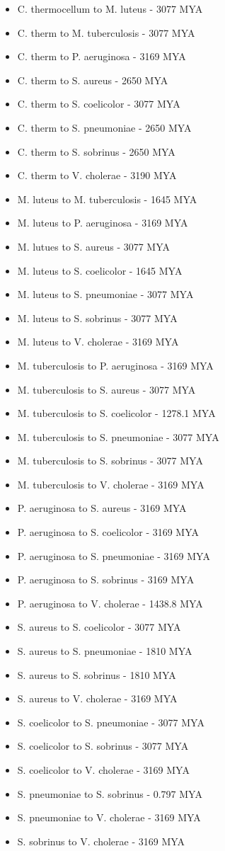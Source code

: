 \documentclass[11pt]{labbook}
\begin{document}
\begin{itemize}
\item C. thermocellum to M. luteus - 3077 MYA
\item C. therm to M. tuberculosis - 3077 MYA
\item C. therm to P. aeruginosa - 3169 MYA
\item C. therm to S. aureus - 2650 MYA
\item C. therm to S. coelicolor - 3077 MYA
\item C. therm to S. pneumoniae - 2650 MYA
\item C. therm to S. sobrinus - 2650 MYA
\item C. therm to V. cholerae - 3190 MYA
\item M. luteus to M. tuberculosis - 1645 MYA
\item M. luteus to P. aeruginosa - 3169 MYA
\item M. lutues to S. aureus - 3077 MYA
\item M. luteus to S. coelicolor - 1645 MYA
\item M. luteus to S. pneumoniae - 3077 MYA
\item M. luteus to S. sobrinus - 3077 MYA
\item M. luteus to V. cholerae - 3169 MYA
\item M. tuberculosis to P. aeruginosa - 3169 MYA
\item M. tuberculosis to S. aureus - 3077 MYA
\item M. tuberculosis to S. coelicolor - 1278.1 MYA
\item M. tuberculosis to S. pneumoniae - 3077 MYA
\item M. tuberculosis to S. sobrinus - 3077 MYA
\item M. tuberculosis to V. cholerae - 3169 MYA
\item P. aeruginosa to S. aureus - 3169 MYA
\item P. aeruginosa to S. coelicolor - 3169 MYA
\item P. aeruginosa to S. pneumoniae - 3169 MYA
\item P. aeruginosa to S. sobrinus - 3169 MYA
\item P. aeruginosa to V. cholerae - 1438.8 MYA
\item S. aureus to S. coelicolor - 3077 MYA
\item S. aureus to S. pneumoniae - 1810 MYA
\item S. aureus to S. sobrinus - 1810 MYA
\item S. aureus to V. cholerae - 3169 MYA
\item S. coelicolor to S. pneumoniae - 3077 MYA
\item S. coelicolor to S. sobrinus - 3077 MYA
\item S. coelicolor to V. cholerae - 3169 MYA
\item S. pneumoniae to S. sobrinus - 0.797 MYA
\item S. pneumoniae to V. cholerae - 3169 MYA
\item S. sobrinus to V. cholerae - 3169 MYA
\end{itemize}
\end{document}
